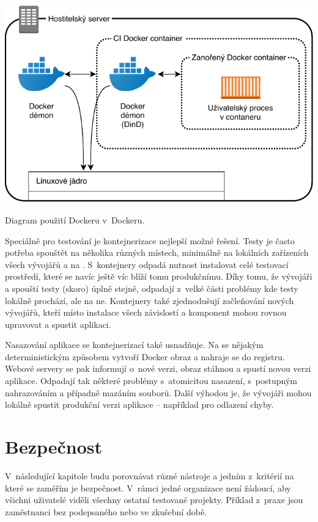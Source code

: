         \begin{iffigure}
            \centering
            \includegraphics[width=\textwidth]{media/dind-ci.pdf}
            \caption{Diagram použití Dockeru v~Dockeru.}
            \label{fig:dind-ci}
        \end{iffigure}

        Speciálně pro testování je kontejnerizace nejlepší možné řešení. Testy je často potřeba spouštět na několika různých místech, minimálně na lokálních zařízeních všech vývojářů a na \CI. S~kontejnery odpadá nutnost instalovat celé testovací prostředí, které se navíc ještě víc blíží tomu produkčnímu. Díky tomu, že vývojáři a \CI spouští testy (skoro) úplně stejně, odpadají z~velké části problémy kde testy lokálně prochází, ale na \CI ne. Kontejnery také zjednodušují začleňování nových vývojářů, kteří místo instalace všech závislostí a komponent mohou rovnou upravovat a spustit aplikaci.

        Nasazování aplikace se kontejnerizací také usnadňuje. Na \CI se nějakým deterministickým způsobem vytvoří Docker obraz a nahraje se do registru. Webové servery se pak informují o~nové verzi, obraz stáhnou a spustí novou verzi aplikace. Odpadají tak některé problémy s~atomicitou nasazení, s~postupným nahrazováním a případně mazáním souborů. Další výhodou je, že vývojáři mohou lokálně spustit produkční verzi aplikace -- například pro odlazení chyby.

    \section*{Bezpečnost}
        V~následující kapitole budu porovnávat různé \CI nástroje a jedním z~kritérií na které se zaměřím je bezpečnost. V~rámci jedné organizace není žádoucí, aby všichni uživatelé viděli všechny ostatní testované projekty. Příklad z~praxe jsou zaměstnanci bez podepsaného  nebo ve zkušební době.

